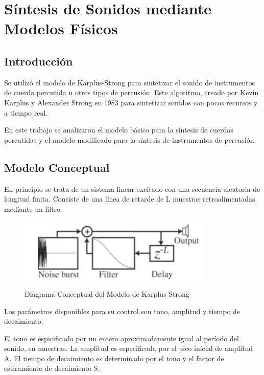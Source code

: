 \chapter{Síntesis de Sonidos mediante Modelos Físicos}

\section{Introducción}
Se utilizó el modelo de Karplus-Strong para sintetizar el sonido de instrumentos de cuerda percutida u otros tipos de percusión. Este algoritmo, creado por Kevin Karplus y Alexander Strong en 1983 para sintetizar sonidos con pocos recursos y a tiempo real.

En este trabajo se analizaron el modelo básico para la síntesis de cuerdas percutidas y el modelo modificado para la síntesis de instrumentos de percusión.

\section{Modelo Conceptual}

En principio se trata de un sistema linear excitado con una secuencia aleatoria de longitud finita. Consiste de una línea de retarde de L muestras retroalimentadas mediante un filtro.

\begin{figure}[ht]
    \centering
    \includegraphics{res/ks_concept.jpg}
    \caption{Diagrama Conceptual del Modelo de Karplus-Strong}
    \label{fig:KS_model}
\end{figure}


Los parámetros disponibles para su control son tono, amplitud y tiempo de decaimiento.

El tono es espicificado por un entero aproximadamente igual al período del sonido, en muestras.
La amplitud es especificada por el pico inicial de amplitud A.
El tiempo de decaimiento es determinado por el tono y el factor de estiramiento de decaimiento	S.
